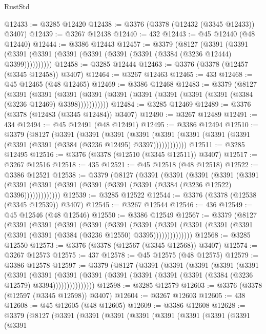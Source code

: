 \begin{lexlean}{RustStd}
\begin{coremodule}
{\begin{coremodule}
{{{{{{{{{{{{{{{{{{{{{{{{{{{{{{{{{{{{{{{@12433 := @3285 @12420
@12438 := @3376 (@3378 (@12432 (@3345 @12433)) @3407)
@12439 := @3267 @12438
@12440 := 432
@12443 := @45 @12440 (@48 @12440)
@12444 := @3386 @12443
@12457 := @3379
    (@8127
      (@3391 (@3391 (@3391 (@3391 (@3391 (@3391 (@3391 (@3391 (@3384 (@3236 @12444) @3399))))))))))
@12458 := @3285 @12444
@12463 := @3376 (@3378 (@12457 (@3345 @12458)) @3407)
@12464 := @3267 @12463
@12465 := 433
@12468 := @45 @12465 (@48 @12465)
@12469 := @3386 @12468
@12483 := @3379
    (@8127
      (@3391
        (@3391
          (@3391 (@3391 (@3391 (@3391 (@3391 (@3391 (@3391 (@3384 (@3236 @12469) @3398)))))))))))
@12484 := @3285 @12469
@12489 := @3376 (@3378 (@12483 (@3345 @12484)) @3407)
@12490 := @3267 @12489
@12491 := 434
@12494 := @45 @12491 (@48 @12491)
@12495 := @3386 @12494
@12510 := @3379
    (@8127
      (@3391
        (@3391
          (@3391
            (@3391 (@3391 (@3391 (@3391 (@3391 (@3391 (@3391 (@3384 (@3236 @12495) @3397))))))))))))
@12511 := @3285 @12495
@12516 := @3376 (@3378 (@12510 (@3345 @12511)) @3407)
@12517 := @3267 @12516
@12518 := 435
@12521 := @45 @12518 (@48 @12518)
@12522 := @3386 @12521
@12538 := @3379
    (@8127
      (@3391
        (@3391
          (@3391
            (@3391
              (@3391
                (@3391 (@3391 (@3391 (@3391 (@3391 (@3391 (@3384 (@3236 @12522) @3396)))))))))))))
@12539 := @3285 @12522
@12544 := @3376 (@3378 (@12538 (@3345 @12539)) @3407)
@12545 := @3267 @12544
@12546 := 436
@12549 := @45 @12546 (@48 @12546)
@12550 := @3386 @12549
@12567 := @3379
    (@8127
      (@3391
        (@3391
          (@3391
            (@3391
              (@3391
                (@3391
                  (@3391
                    (@3391 (@3391 (@3391 (@3391 (@3391 (@3384 (@3236 @12550) @3395))))))))))))))
@12568 := @3285 @12550
@12573 := @3376 (@3378 (@12567 (@3345 @12568)) @3407)
@12574 := @3267 @12573
@12575 := 437
@12578 := @45 @12575 (@48 @12575)
@12579 := @3386 @12578
@12597 := @3379
    (@8127
      (@3391
        (@3391
          (@3391
            (@3391
              (@3391
                (@3391
                  (@3391
                    (@3391
                      (@3391 (@3391 (@3391 (@3391 (@3391 (@3384 (@3236 @12579) @3394)))))))))))))))
@12598 := @3285 @12579
@12603 := @3376 (@3378 (@12597 (@3345 @12598)) @3407)
@12604 := @3267 @12603
@12605 := 438
@12608 := @45 @12605 (@48 @12605)
@12609 := @3386 @12608
@12628 := @3379
    (@8127
      (@3391
        (@3391
          (@3391
            (@3391
              (@3391
                (@3391
                  (@3391
                    (@3391
                      (@3391
}}}}}}}}}}}}}}}}}}}}}}}}}}}}}}}}}}}}}}}
\end{coremodule}}
\end{coremodule}
\end{lexlean}
